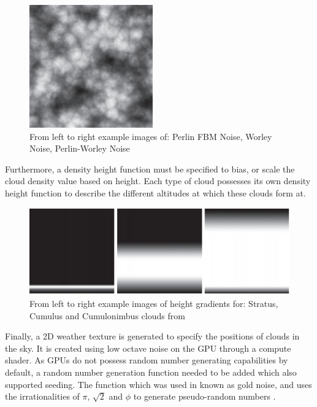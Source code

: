 \documentclass[10pt, openany]{book}
\begin{document}
\begin{figure}[H]
\begin{minipage}{.3\textwidth}
  \centering
  \includegraphics[width=.6\linewidth]{perlin-worley}
\end{minipage}
\caption{From left to right example images of: Perlin FBM Noise, Worley Noise, Perlin-Worley Noise}
\end{figure}	

Furthermore, a density height function must be specified to bias, or scale the cloud density value based on height. Each type of cloud possesses its own density height function to describe the different altitudes at which these clouds form at. \citep{gpupro7}

\begin{figure}[H]
	\centering
	\includegraphics[width=.6\linewidth]{height-functions}
	\caption{From left to right example images of height gradients for: Stratus, Cumulus and Cumulonimbus clouds from \citep{gpupro7}}
\end{figure}

Finally, a 2D weather texture is generated to specify the positions of clouds in the sky. It is created using low octave noise on the GPU through a compute shader. As GPUs do not possess random number generating capabilities by default, a random number generation function needed to be added which also supported seeding. The function which was used in known as gold noise, and uses the irrationalities of $\pi$, $\sqrt{2}$ and $\phi$ to generate pseudo-random numbers \citep{goldnoise}. 
\end{document}
